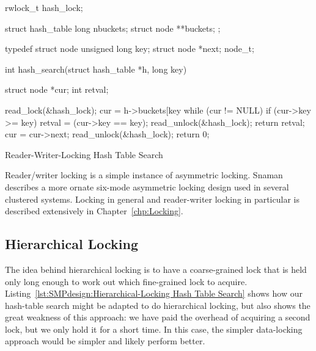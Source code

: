 \begin{listing}[tbp]
\begin{VerbatimL}[commandchars=\\\[\]]
rwlock_t hash_lock;

struct hash_table
{
	long nbuckets;
	struct node **buckets;
};

typedef struct node {
	unsigned long key;
	struct node *next;
} node_t;

int hash_search(struct hash_table *h, long key)
{
	struct node *cur;
	int retval;

	read_lock(&hash_lock);
	cur = h->buckets[key %
	while (cur != NULL) {
		if (cur->key >= key) {
			retval = (cur->key == key);
			read_unlock(&hash_lock);
			return retval;
		}
		cur = cur->next;
	}
	read_unlock(&hash_lock);
	return 0;
}
\end{VerbatimL}
\caption{Reader-Writer-Locking Hash Table Search}
\label{lst:SMPdesign:Reader-Writer-Locking Hash Table Search}
\end{listing}

Reader/writer locking is a simple instance of asymmetric locking.
Snaman~\cite{Snaman87} describes a more ornate six-mode
asymmetric locking design used in several clustered systems.
Locking in general and reader-writer locking in particular is described
extensively in
Chapter~\ref{chp:Locking}.

\subsection{Hierarchical Locking}
\label{sec:SMPdesign:Hierarchical Locking}

The idea behind hierarchical locking is to have a coarse-grained lock
that is held only long enough to work out which fine-grained lock
to acquire.
Listing~\ref{lst:SMPdesign:Hierarchical-Locking Hash Table Search}
shows how our hash-table search might be adapted to do hierarchical
locking, but also shows the great weakness of this approach:
we have paid the overhead of acquiring a second lock, but we only
hold it for a short time.
In this case, the simpler data-locking approach would be simpler
and likely perform better.

